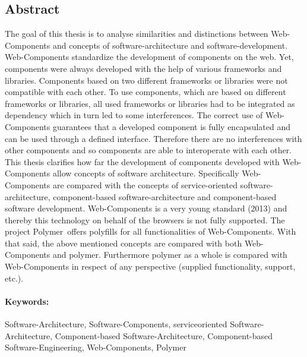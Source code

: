 \subsection*{Abstract}

The goal of this thesis is to analyse similarities and distinctions between Web-Components and concepts of software-architecture and software-development. Web-Components standardize the development of components on the web. Yet, components were always developed with the help of various frameworks and libraries. Components based on two different frameworks or libraries were not compatible with each other. To use components, which are based on different frameworks or libraries, all used frameworks or libraries had to be integrated as dependency which in turn led to some interferences. The correct use of Web-Components guarantees that a developed component is fully encapsulated and can be used through a defined interface. Therefore there are no interferences with other components and so components are able to interoperate with each other. This thesis clarifies how far the development of components developed with Web-Components allow concepts of software architecture. Specifically Web-Components are compared with the concepts of service-oriented software-architecture, component-based software-architecture and component-based software development. Web-Components is a very young standard (2013) and thereby this technology on behalf of the browsers is not fully supported. The project \glqq Polymer\grqq\ offers polyfills for all functionalities of Web-Components. With that said, the above mentioned concepts are compared with both Web-Components and polymer. Furthermore polymer as a whole is compared with Web-Components in respect of any perspective (supplied functionality, support, etc.).

\paragraph{Keywords:}
Software-Architecture, Software-Components, serviceoriented Software-Architecture, Component-based Software-Architecture, Component-based Software-Engineering, Web-Components, Polymer

